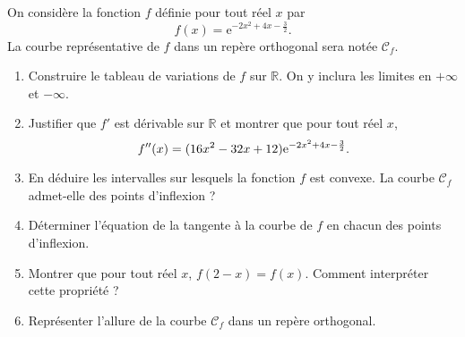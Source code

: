\documentclass[11pt,fleqn, openany]{book} %
\begin{document}
\begin{exercise}
On considère la fonction $f$ définie pour tout réel $x$ par
\[ f(x)=\mathrm{e}^{-2x^2+4x-\frac{3}{2}}.\]
La courbe représentative de $f$ dans un repère orthogonal sera notée $\mathcal{C}_f$.
\vskip5pt
\begin{enumerate}
\item Construire le tableau de variations de $f$ sur $\mathbb{R}$. On y inclura les limites en $+\infty$ et $-\infty$.

\item Justifier que $f'$ est dérivable sur $\mathbb{R}$ et montrer que pour tout réel $x$, 
\[ f''(x)=(16x^2-32x+12)\mathrm{e}^{-2x^2+4x-\frac{3}{2}}.\]
\item En déduire les intervalles sur lesquels la fonction $f$ est convexe. La courbe $\mathcal{C}_f$ admet-elle des points d'inflexion ?
\item Déterminer l'équation de la tangente à la courbe de $f$ en chacun des points d'inflexion.
\item Montrer que pour tout réel $x$, $f(2-x)=f(x)$. Comment interpréter cette propriété ?
\item Représenter l'allure de la courbe $\mathcal{C}_f$ dans un repère orthogonal.\end{enumerate}\end{exercise}
\end{document}

